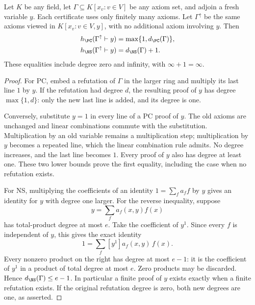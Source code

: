 \begin{proposition}\label{tx:prop:fresh-target}
Let $K$ be any field, let $\Gamma\subseteq K[x_v:v\in V]$ be any axiom
set, and adjoin a fresh variable $y$. Each certificate uses only
finitely many axioms. Let $\Gamma^\uparrow$ be the same axioms viewed
in $K[x_v:v\in V,y]$, with no additional axiom involving $y$. Then
\begin{equation}\label{tx:eq:fresh-identities}
 \begin{aligned}
 h_{\PC}(\Gamma^\uparrow\vdash y)
       &=\max\{1,d_{\PC}(\Gamma)\},\\
 h_{\NS}(\Gamma^\uparrow\vdash y)
       &=d_{\NS}(\Gamma)+1.
 \end{aligned}
\end{equation}
These equalities include degree zero and infinity, with
$\infty+1=\infty$.
\end{proposition}
\begin{proof}
For PC, embed a refutation of $\Gamma$ in the larger ring and multiply
its last line $1$ by $y$. If the refutation had degree $d$, the resulting
proof of $y$ has degree $\max\{1,d\}$: only the new last line is added,
and its degree is one.

Conversely, substitute $y=1$ in every line of a PC proof of $y$.
The old axioms are unchanged and linear combinations commute with the
substitution. Multiplication by an old variable remains a multiplication
step; multiplication by $y$ becomes a repeated line, which the linear
combination rule admits. No degree increases, and the last line becomes
$1$. Every proof of $y$ also has degree at least one. These two lower
bounds prove the first equality, including the case when no refutation
exists.

For NS, multiplying the coefficients of an identity
$1=\sum_fa_ff$ by $y$ gives an identity for $y$ with degree one larger.
For the reverse inequality, suppose
\[
                    y=\sum_f a_f(x,y)f(x)
\]
has total-product degree at most $e$. Take the coefficient of $y^1$.
Since every $f$ is independent of $y$, this gives the exact identity
\[
                    1=\sum_f [y^1]a_f(x,y)\,f(x).
\]
Every nonzero product on the right has degree at most $e-1$: it is the
coefficient of $y^1$ in a product of total degree at most $e$. Zero
products may be discarded. Hence $d_{\NS}(\Gamma)\le e-1$.
In particular a finite proof of $y$ exists exactly when a finite
refutation exists. If the original refutation degree is zero, both
new degrees are one, as asserted.
\end{proof}

